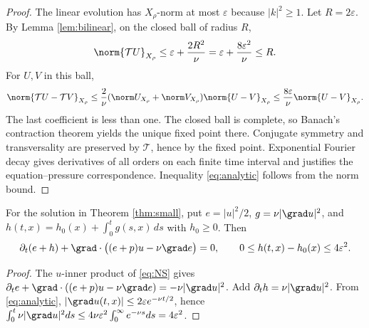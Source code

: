 \begin{proof}
The linear evolution has $X_\rho$-norm at most $\varepsilon$ because $|k|^2\ge1$. Let $R=2\varepsilon$. By Lemma \ref{lem:bilinear}, on the closed ball of radius $R$,
\[
\norm{\mathcal TU}_{X_\rho}\le\varepsilon+\frac{2R^2}{\nu}
=\varepsilon+\frac{8\varepsilon^2}{\nu}\le R.
\]
For $U,V$ in this ball,
\[
\norm{\mathcal TU-\mathcal TV}_{X_\rho}\le\frac2\nu
(\norm U_{X_\rho}+\norm V_{X_\rho})\norm{U-V}_{X_\rho}
\le\frac{8\varepsilon}{\nu}\norm{U-V}_{X_\rho}.
\]
The last coefficient is less than one. The closed ball is complete, so Banach's contraction theorem yields the unique fixed point there. Conjugate symmetry and transversality are preserved by $\mathcal T$, hence by the fixed point. Exponential Fourier decay gives derivatives of all orders on each finite time interval and justifies the equation--pressure correspondence. Inequality \eqref{eq:analytic} follows from the norm bound.
\end{proof}
\begin{corollary}\label{cor:local}
For the solution in Theorem \ref{thm:small}, put $e=|u|^2/2$, $g=\nu|\grad u|^2$, and $h(t,x)=h_0(x)+\int_0^t g(s,x)\,ds$ with $h_0\ge0$. Then
\begin{equation}\label{eq:local}
\partial_t(e+h)+\grad\cdot\big((e+p)u-\nu\grad e\big)=0,
\qquad 0\le h(t,x)-h_0(x)\le4\varepsilon^2.
\end{equation}
\end{corollary}
\begin{proof}
The $u$-inner product of \eqref{eq:NS} gives
$\partial_t e+\grad\cdot((e+p)u-\nu\grad e)=-\nu|\grad u|^2$.
Add $\partial_t h=\nu|\grad u|^2$. From \eqref{eq:analytic}, $|\grad u(t,x)|\le2\varepsilon e^{-\nu t/2}$, hence
$\int_0^t\nu|\grad u|^2 ds\le4\nu\varepsilon^2\int_0^\infty e^{-\nu s}ds=4\varepsilon^2$.
\end{proof}

